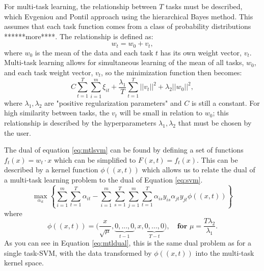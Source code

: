 \documentclass{llncs}
\begin{document}
For multi-task learning, the relationship between $T$ tasks must be described, which Evgeniou and Pontil approach using the hierarchical Bayes method. This assumes that each task function comes from a class of probability distributions ******more****.  The relationship is defined as:\\
\begin{equation}
\label{eq:sim}
 w_t = w_0 + v_t ,
\end{equation}
where $w_0$ is the mean of the data and each task $t$ has its own weight vector, $v_t$. Multi-task learning allows for simultaneous learning of the mean of all tasks, $w_0$, and each task weight vector, $v_t$, so the minimization function then becomes:\\
\begin{equation}
\label{eq:mtlsvm}
 C \sum_{t=1}^T \sum_{i=1}^m \xi_{it} + \frac{\lambda_1}{T} \sum_{t=1}^T ||v_t||^2 + \lambda_2||w_0||^2 ,
\end{equation}
where $\lambda_1, \lambda_2$ are "positive regularization parameters" and $C$ is still a constant.  For high similarity between tasks, the $v_t$ will be small in relation to $w_0$; this relationship is described by the hyperparameters $\lambda_1, \lambda_2$ that must be chosen by the user.

The dual of equation \ref{eq:mtlsvm} can be found by defining a set of functions $f_t(x) = w_t \cdot x$ which can be simplified to $F(x,t) = f_t(x)$.  This can be described by a kernel function $\phi((x,t))$ which allows us to relate the dual of a multi-task learning problem to the dual of Equation \ref{eq:svm}.
\begin{equation}
\label{eq:mtldual}
\max_{\alpha_{it}}  \left\{ \sum_{i=1}^m\sum_{t=1}^T \alpha_{it} -  \sum_{i=1}^m\sum_{s=1}^T\sum_{j=1}^m\sum_{t=1}^T  \alpha_{is}y_{is}\alpha_{jt}y_{jt}\phi((x,t))      \right\}
\end{equation}
where
\begin{equation}
\phi((x,t)) = \big(\frac{x}{\sqrt{\mu}}, \underbrace{0,...,0}_{t-1}, x, \underbrace{0,...,0}_{T-t} \big), \quad \textbf{for  } \mu = \frac{T\lambda_2}{\lambda_1} .
\end{equation}
As you can see in Equation \ref{eq:mtldual}, this is the same dual problem as for a single task-SVM, with the data transformed by $\phi((x,t))$ into the multi-task kernel space.
\end{document}
